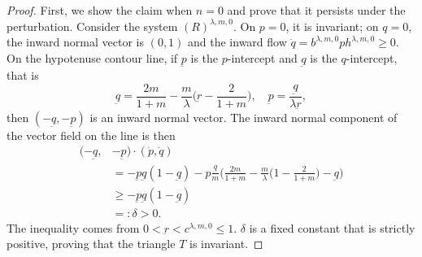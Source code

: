 \documentclass[a4paper,11pt]{article}
\begin{document}
\begin{proof}
First, we show the claim when $n=0$ and prove that it persists under the perturbation. Consider the system $(R)^{\lambda,m,0}$. On $p=0$, it is invariant; on $q=0$, the inward normal vector is $(0,1)$ and the inward flow $\dot{q} = b^{ \lambda,m,0}ph^{ \lambda,m,0} \ge 0$. On the hypotenuse contour line, if $\underbar{p}$ is the $p$-intercept and $\underbar{q}$ is the $q$-intercept, that is
$$ \underbar{q} = \frac{2m}{1+m}-\frac{m}{ \lambda } \big( \underbar{r} - \frac{2}{1+m} \big), \quad \underbar{p} = \frac{ \underbar{q} }{ \lambda \underbar{r} },$$
then $(-\underbar{q}, -\underbar{p})$ is an inward normal vector.
The inward normal component of the vector field on the line is then
\begin{align*}
 (-\underbar{q}, &-\underbar{p}) \cdot ( \dot{p}, \dot{q} ) \\
 &=-\underbar{p}\underbar{q}(1-\underbar{q}) - p \frac{\underbar{q}}{m}\Big( \frac{2m}{1+m} - \frac{m}{ \lambda} \big( 1-\frac{2}{1+m} \big) - \underbar{q}\Big)\\
 &\ge -\underbar{p}\underbar{q}(1-\underbar{q}) \\%
 &=: \delta >0.
\end{align*}
The inequality comes from $0<\underbar{r} < c^{ \lambda,m,0} \le 1$. $\delta$ is a fixed constant that is strictly positive, proving that the triangle $T$ is invariant.



\end{proof}
\end{document}
